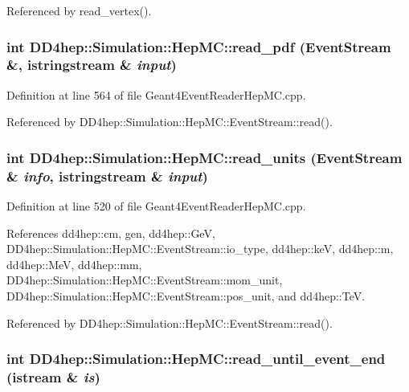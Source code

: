 Referenced by read\_\-vertex().\hypertarget{namespace_d_d4hep_1_1_simulation_1_1_hep_m_c_a599dd238f1b1dc069a14f3bf57c09cfb}{
\subsubsection[{read\_\-pdf}]{\setlength{\rightskip}{0pt plus 5cm}int DD4hep::Simulation::HepMC::read\_\-pdf (EventStream \&, \/  istringstream \& {\em input})}}
\label{namespace_d_d4hep_1_1_simulation_1_1_hep_m_c_a599dd238f1b1dc069a14f3bf57c09cfb}


Definition at line 564 of file Geant4EventReaderHepMC.cpp.

Referenced by DD4hep::Simulation::HepMC::EventStream::read().\hypertarget{namespace_d_d4hep_1_1_simulation_1_1_hep_m_c_a35bd1c93d31d755bf0b911399c90c789}{
\subsubsection[{read\_\-units}]{\setlength{\rightskip}{0pt plus 5cm}int DD4hep::Simulation::HepMC::read\_\-units (EventStream \& {\em info}, \/  istringstream \& {\em input})}}
\label{namespace_d_d4hep_1_1_simulation_1_1_hep_m_c_a35bd1c93d31d755bf0b911399c90c789}


Definition at line 520 of file Geant4EventReaderHepMC.cpp.

References dd4hep::cm, gen, dd4hep::GeV, DD4hep::Simulation::HepMC::EventStream::io\_\-type, dd4hep::keV, dd4hep::m, dd4hep::MeV, dd4hep::mm, DD4hep::Simulation::HepMC::EventStream::mom\_\-unit, DD4hep::Simulation::HepMC::EventStream::pos\_\-unit, and dd4hep::TeV.

Referenced by DD4hep::Simulation::HepMC::EventStream::read().\hypertarget{namespace_d_d4hep_1_1_simulation_1_1_hep_m_c_a433e938fb3dfef8ae2590fa16cdb2229}{
\subsubsection[{read\_\-until\_\-event\_\-end}]{\setlength{\rightskip}{0pt plus 5cm}int DD4hep::Simulation::HepMC::read\_\-until\_\-event\_\-end (istream \& {\em is})}}
\label{namespace_d_d4hep_1_1_simulation_1_1_hep_m_c_a433e938fb3dfef8ae2590fa16cdb2229}


